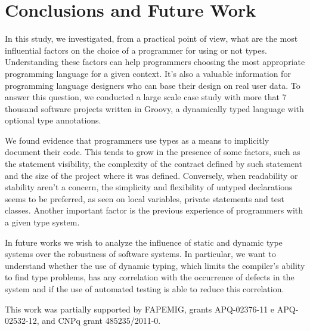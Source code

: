 \documentclass[preprint]{sigplanconf}
\begin{document}
%
%
\section{Conclusions and Future Work\label{conclusion}}
In this study, we investigated, from a practical point of view, what are the most influential factors on the choice of a programmer for using or not types.
Understanding these factors can help programmers choosing the most appropriate programming language for a given context.
It's also a valuable information for programming language designers who can base their design on real user data.
To answer this question, we conducted a large scale case study with more that 7 thousand software projects written in Groovy, a dynamically typed language with optional type annotations. 

We found evidence that programmers use types as a means to implicitly document their code.
This tends to grow in the presence of some factors, such as the statement visibility, the complexity of the contract defined by such statement and the size of the project where it was defined. 
Conversely, when readability or stability aren't a concern, the simplicity and flexibility of untyped declarations seems to be preferred, as seen on local variables, private statements and test classes.
Another important factor is the previous experience of programmers with a given type system.

In future works we wish to analyze the influence of static and dynamic type systems over the robustness of software systems.
In particular, we want to understand whether the use of dynamic typing, which limits the compiler's ability to find type problems, has any correlation with the occurrence of defects in the system and if the use of automated testing is able to reduce this correlation.

\acks
This work was partially supported by FAPEMIG, grants APQ-02376-11 e APQ-02532-12, and CNPq grant 485235/2011-0. 
\end{document}
